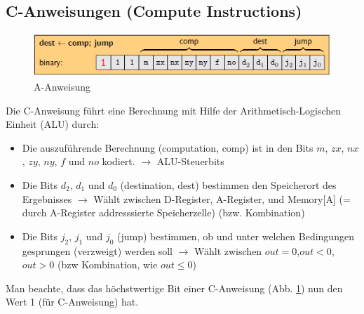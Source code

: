 \documentclass[12pt]{report}
\begin{document}
\subsection{C-Anweisungen (Compute Instructions)}
\begin{figure}[H]
  \caption{A-Anweisung}
  \label{fig:maschinensprache_c-anweisung}
  \centering
  \includegraphics{maschinensprache_c-anweisung}
\end{figure}
Die C-Anweisung führt eine Berechnung mit Hilfe der Arithmetisch-Logischen Einheit (ALU) durch:
\begin{itemize}
  \item Die auszuführende Berechnung (computation, comp) ist in den Bits $m$, $zx$, $nx$, $zy$, $ny$, $f$ und $no$ kodiert.
        \subitem $\rightarrow$ ALU-Steuerbits

  \item Die Bits $d_2$, $d_1$ und $d_0$ (destination, dest) bestimmen den Speicherort des Ergebnisses
        \subitem $\rightarrow$ Wählt zwischen D-Register, A-Register, und Memory[A] (= durch A-Register addresssierte Speicherzelle) (bzw. Kombination)

  \item Die Bits $j_2$, $j_1$ und $j_0$ (jump) bestimmen, ob und unter welchen Bedingungen gesprungen (verzweigt) werden soll
        \subitem $\rightarrow$ Wählt zwischen $out = 0$,$out<0$, $out>0$ (bzw Kombination, wie $out \leq 0$)
\end{itemize}

Man beachte, dass das höchstwertige Bit einer C-Anweisung (Abb. \ref{fig:maschinensprache_c-anweisung}) nun den Wert 1 (für C-Anweisung) hat.
\end{document}
